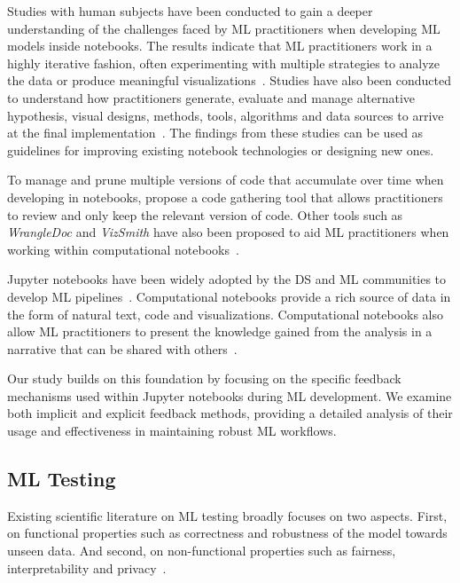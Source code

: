 \documentclass[journal]{IEEEtran}       %
\begin{document}
Studies with human subjects have been conducted to gain a deeper
understanding of the challenges faced by ML practitioners when
developing ML models inside notebooks. The results indicate that ML
practitioners work in a highly iterative fashion, often experimenting
with multiple strategies to analyze the data or produce meaningful
visualizations~\cite{kandel2012enterprise,kery2018story,liu2019understanding,chattopadhyay2020whats}.
Studies have also been conducted to understand how practitioners
generate, evaluate and manage alternative hypothesis, visual designs,
methods, tools, algorithms and data sources to arrive at the final
implementation~\cite{liu2019understanding,kandel2012enterprise}. The
findings from these studies can be used as guidelines for improving
existing notebook technologies or designing new ones.

To manage and prune multiple versions of code that accumulate over
time when developing in notebooks, \cite{head2019managing} propose a
code gathering tool that allows practitioners to review and only keep
the relevant version of code. Other tools such as \textit{WrangleDoc}
and \textit{VizSmith} have also been proposed to aid ML practitioners
when working within computational
notebooks~\cite{yang2021subtle,bavishi2021vizsmith}.

Jupyter notebooks have been widely adopted by the DS and ML
communities to develop ML
pipelines~\cite{wang2020assessing,pimentel2019large-scale,quaranta2021kgtorrent}.
Computational notebooks provide a rich source of data in the form of
natural text, code and visualizations. Computational notebooks also
allow ML practitioners to present the knowledge gained from the
analysis in a narrative that can be shared with
others~\cite{rule2018exploration}.

Our study builds on this foundation by focusing on the specific
feedback mechanisms used within Jupyter notebooks during ML
development. We examine both implicit and explicit feedback methods,
providing a detailed analysis of their usage and effectiveness in
maintaining robust ML workflows.

\subsection{ML Testing}\label{sec:ml-testing}

Existing scientific literature on ML testing broadly focuses on two
aspects. First, on functional properties such as correctness and
robustness of the model towards unseen data. And second, on
non-functional properties such as fairness, interpretability and
privacy~\cite{zhang2022machine,mehrabi2021survey,chen2022fairness}.
\end{document}
